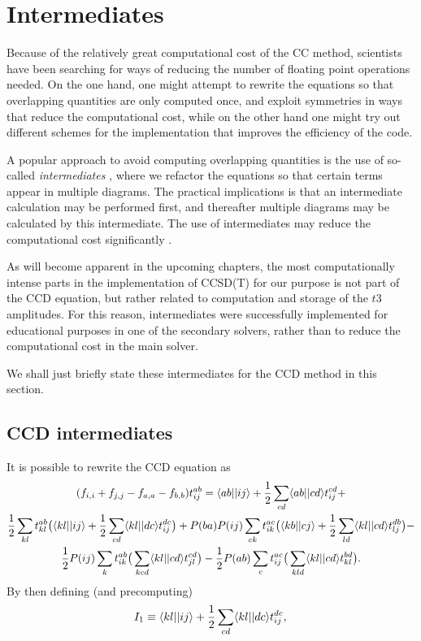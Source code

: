 \section{Intermediates}

Because of the relatively great computational cost of the CC method,
scientists have been searching for ways of reducing the number of floating point operations
needed. On the one hand, one might attempt to rewrite the equations so
that overlapping quantities are only computed once, and
exploit symmetries in ways that reduce the computational cost, while
on the other hand one might try out different schemes for the
implementation that improves the efficiency of the code.

A popular approach to avoid computing overlapping quantities is the
use of so-called \emph{intermediates} \cite{CrawfordSchaefer}, where
we refactor the equations so that certain
terms appear in multiple diagrams. The practical implications is that
an intermediate calculation may be performed first, and thereafter
multiple diagrams may be calculated by this intermediate. The
use of intermediates may reduce the computational cost
significantly \cite{Baardsen2014}.

As will become apparent in the upcoming chapters, the most
computationally intense parts in the implementation of CCSD(T) for our
purpose is not part of the CCD equation, but rather related to
computation and storage of the $t3$ amplitudes. For this reason,
intermediates were successfully implemented for educational purposes in
one of the secondary solvers, rather than to reduce the computational
cost in the main solver.

We shall just briefly state these intermediates for the CCD method in this section.

\subsection{CCD intermediates}

It is possible to rewrite the CCD equation as \cite{Baardsen2014}
\begin{multline}
(f_{i,i} + f_{j,j} - f_{a,a} - f_{b,b})t^{ab}_{ij} =\langle ab \vert \vert ij \rangle + 
\frac{1}{2} \sum_{cd} \langle ab \vert \vert cd \rangle t_{ij}^{cd} +\\
\frac{1}{2} \sum_{kl} t^{ab}_{kl} \big{(}  \langle kl \vert \vert ij \rangle   + \frac{1}{2} \sum_{cd}   \langle kl \vert \vert dc \rangle t_{ij}^{dc}  \big{)} +
P(ba)P(ij) \sum_{ck} t_{ik}^{ac} \big{(} \langle kb \vert \vert cj \rangle  + \frac{1}{2} \sum_{ld} \langle kl \vert \vert cd \rangle t_{lj}^{db}\big{)} - \\
\frac{1}{2}P(ij) \sum_k t^{ab}_{ik} \big{(} \sum_{kcd} \langle kl \vert \vert cd \rangle t^{cd}_{jl} \big{)} - 
\frac{1}{2}P(ab) \sum_c t^{ac}_{ij} \big{(} \sum_{kld} \langle kl \vert \vert cd \rangle t^{bd}_{kl} \big{)}.
\end{multline}
By then defining (and precomputing)
\begin{equation}
I_1 \equiv \langle kl \vert \vert ij \rangle   + \frac{1}{2} \sum_{cd}   \langle kl \vert \vert dc \rangle t_{ij}^{dc},  \\
\end{equation}

